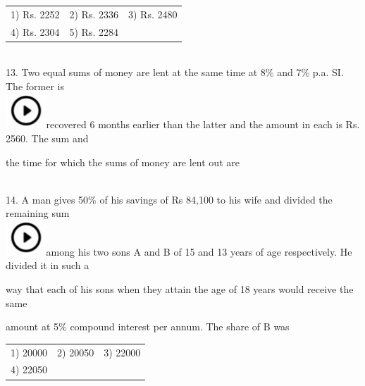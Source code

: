 \documentclass{article}
\begin{document}
	\noindent \begin{tabular}{p{1.7in} p{1.6in} p{1.6in}} \\ 
 1) Rs. 2252             & 2) Rs. 2336       & 3) Rs. 2480       \\
4) Rs. 2304       & 5) Rs. 2284 \\
\end{tabular}
	
	\noindent  \\  
	
	13. Two equal sums of money are lent at the same time at 8\% and 7\% p.a. SI. The former is \noindent \\ \includegraphics*[width=0.60in, height=0.52in]{images/image1}recovered 6 months earlier than the latter and the amount in each is Rs. 2560. The sum and
	
	\noindent the time for which the sums of money are lent out are
	
	\noindent  \\  
	
	14. A man gives 50\% of his savings of Rs 84,100 to his wife and divided the remaining sum \noindent \\ \includegraphics*[width=0.60in, height=0.52in]{images/image1}among his two sons A and B of 15 and 13 years of age respectively. He divided it in such a
	
	\noindent way that each of his sons when they attain the age of 18 years would receive the same
	
	\noindent 
	
	\noindent amount at 5\% compound interest per annum. The share of B was
	
	\noindent 
	
	\noindent \begin{tabular}{p{1.7in} p{1.6in} p{1.6in}} \\ 
 1) 20000                  & 2) 20050                        & 3) 22000                        \\
4) 22050 \\
\end{tabular}
	
	\noindent  \\  
	
\end{document}
